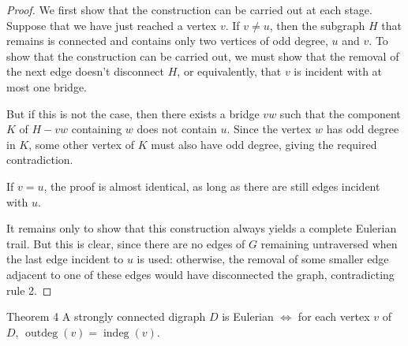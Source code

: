 \documentclass[11pt]{scrartcl}
\theoremstyle{plain}
\theoremstyle{remark}
\begin{document}
\begin{proof}
We first show that the construction can be carried out at each stage. Suppose that we have just reached a vertex $v$. If $v \neq u$, then the subgraph $H$ that remains is connected and contains only two vertices of odd degree, $u$ and $v$. To show that the construction can be carried out, we must show that the removal of the next edge doesn't disconnect $H$, or equivalently, that $v$ is incident with at most one bridge.

But if this is not the case, then there exists a bridge $vw$ such that the component $K$ of $H - vw$ containing $w$ does not contain $u$. Since the vertex $w$ has odd degree in $K$, some other vertex of $K$ must also have odd degree, giving the required contradiction.

\begin{center}
\end{center}

If $v = u$, the proof is almost identical, as long as there are still edges incident with $u$.

It remains only to show that this construction always yields a complete Eulerian trail. But this is clear, since there are no edges of $G$ remaining untraversed when the last edge incident to $u$ is used: otherwise, the removal of some smaller edge adjacent to one of these edges would have disconnected the graph, contradicting rule 2.
\end{proof}

\begin{thmbox}{Theorem 4}
A strongly connected digraph $D$ is Eulerian $\iff$ for each vertex $v$ of $D$, $\operatorname{outdeg}(v) = \operatorname{indeg}(v)$.
\end{thmbox}
\end{document}
